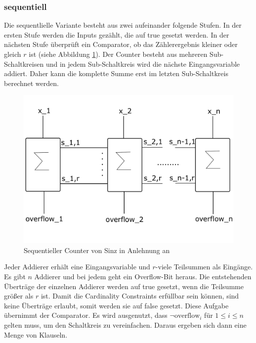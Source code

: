\documentclass[a4,abstract=on]{scrartcl}
\begin{document}
		\subsubsection{sequentiell}
Die sequentlielle Variante besteht aus zwei aufeinander folgende Stufen. In der ersten Stufe werden die Inputs gezählt, die auf true gesetzt werden. In der nächsten Stufe überprüft ein Comparator, ob das Zählerergebnis kleiner oder gleich $r$ ist (siehe Abbildung \ref{fig:sinz_counter}). Der Counter besteht aus mehreren Sub-Schaltkreisen und in jedem Sub-Schaltkreis wird die nächste Eingangsvariable addiert. Daher kann die komplette Summe erst im letzten Sub-Schaltkreis berechnet werden. \\


\begin{figure}[H]
\centering
\includegraphics[width=\textwidth]{Sinz_seq.pdf}
\caption{Sequentieller Counter von Sinz in Anlehnung an \cite[][] {sinz}}
\label{fig:sinz_counter}
\end{figure}

Jeder Addierer erhält eine Eingangsvariable und $r$-viele Teilsummen als Eingänge. Es gibt $n$ Addierer und bei jedem geht ein Overflow-Bit heraus. Die entstehenden Überträge der einzelnen Addierer werden auf true gesetzt, wenn die Teilsumme größer als $r$ ist. Damit die Cardinality Constraints erfüllbar sein können, sind keine Überträge erlaubt, somit werden sie auf false gesetzt. Diese Aufgabe übernimmt der Comparator. Es wird ausgenutzt, dass $\neg \text{overflow}_i$ für $1 \leq i \leq n$ gelten muss, um den Schaltkreis zu vereinfachen. Daraus ergeben sich dann eine Menge von Klauseln.
\end{document}
